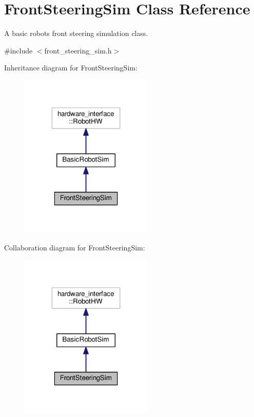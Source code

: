 \hypertarget{classFrontSteeringSim}{}\section{Front\+Steering\+Sim Class Reference}
\label{classFrontSteeringSim}


A basic robot\textquotesingle{}s front steering simulation class.  




{\ttfamily \#include $<$front\+\_\+steering\+\_\+sim.\+h$>$}



Inheritance diagram for Front\+Steering\+Sim\+:
\nopagebreak
\begin{figure}[H]
\begin{center}
\leavevmode
\includegraphics[width=179pt]{classFrontSteeringSim__inherit__graph}
\end{center}
\end{figure}


Collaboration diagram for Front\+Steering\+Sim\+:
\nopagebreak
\begin{figure}[H]
\begin{center}
\leavevmode
\includegraphics[width=179pt]{classFrontSteeringSim__coll__graph}
\end{center}
\end{figure}

